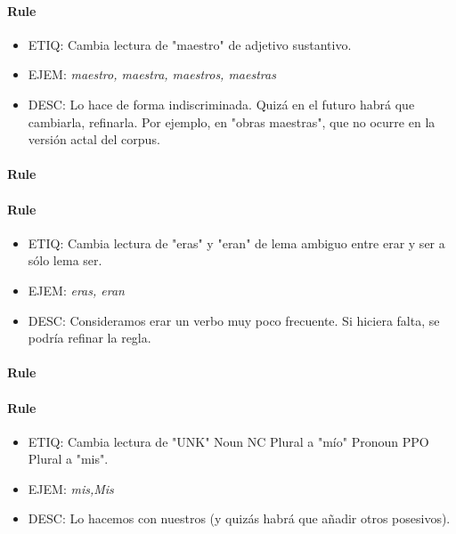 \documentclass[11pt]{report}
\begin{document}
\paragraph*{Rule}
\begin{itemize}
\item ETIQ: Cambia lectura de "maestro" de adjetivo sustantivo.
\item EJEM: \emph{maestro, maestra, maestros, maestras} 
\item DESC: Lo hace de forma indiscriminada. Quizá en el futuro habrá que cambiarla, refinarla. Por ejemplo, en "obras maestras", que no ocurre en la versión actal del corpus.
\end{itemize}

\paragraph*{Rule}
\paragraph*{Rule}
\begin{itemize}
\item ETIQ: Cambia lectura de "eras" y "eran" de lema ambiguo entre erar y ser a sólo lema ser.
\item EJEM: \emph{eras, eran} 
\item DESC: Consideramos erar un verbo muy poco frecuente. Si hiciera falta, se podría refinar la regla.
\end{itemize}

\paragraph*{Rule}
\paragraph*{Rule}
\begin{itemize}
\item ETIQ: Cambia lectura de "UNK" Noun NC Plural a "mío" Pronoun PPO Plural a "mis".
\item EJEM: \emph{mis,Mis} 
\item DESC: Lo hacemos con nuestros (y quizás habrá que añadir otros posesivos).
\end{itemize}
\end{document}
